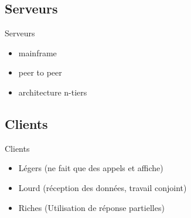 \begin{frame}{\sectitle}
    \def\subsectitle{Serveurs}
    \subsection{\subsectitle}
    \begin{block}{\subsectitle}
        \begin{itemize}
            \item mainframe
            \item peer to peer
            \item architecture n-tiers
        \end{itemize}
    \end{block}
    \def\subsectitle{Clients}
    \subsection{\subsectitle}
    \begin{block}{\subsectitle}
        \begin{itemize}
            \item Légers (ne fait que des appels et affiche)
            \item Lourd (réception des données, travail conjoint)
            \item Riches (Utilisation de réponse partielles)
        \end{itemize}
    \end{block}
\end{frame}

\def\sectitle{Serveur Web}
